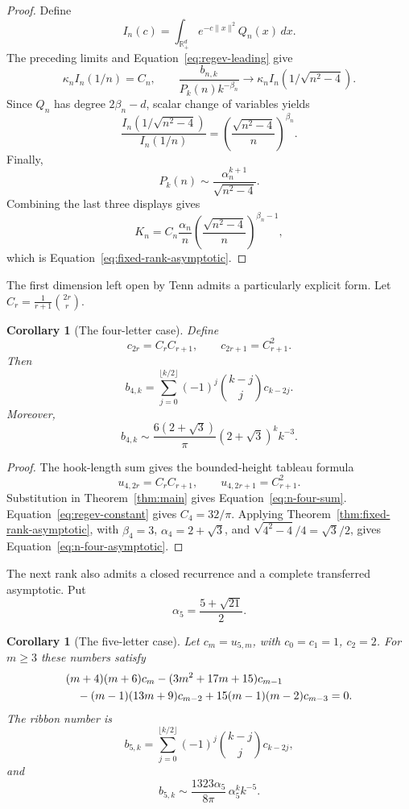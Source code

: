 \documentclass[11pt]{article}
\newtheorem{corollary}[theorem]{Corollary}
\theoremstyle{definition}
\begin{document}
\begin{proof}
Define
\[
 I_n(c)=\int_{\mathbb R_+^d}e^{-c\lVert x\rVert^2}Q_n(x)\,dx.
\]
The preceding limits and Equation~\eqref{eq:regev-leading} give
\[
 \kappa_n I_n(1/n)=C_n,
 \qquad
 \frac{b_{n,k}}{P_k(n)k^{-\beta_n}}
   \longrightarrow \kappa_n I_n(1/\sqrt{n^2-4}).
\]
Since $Q_n$ has degree $2\beta_n-d$, scalar change of variables yields
\[
 \frac{I_n(1/\sqrt{n^2-4})}{I_n(1/n)}
 =\left(\frac{\sqrt{n^2-4}}{n}\right)^{\beta_n}.
\]
Finally,
\[
 P_k(n)\sim\frac{\alpha_n^{k+1}}{\sqrt{n^2-4}}.
\]
Combining the last three displays gives
\[
 K_n=C_n\frac{\alpha_n}{n}
 \left(\frac{\sqrt{n^2-4}}{n}\right)^{\beta_n-1},
\]
which is Equation~\eqref{eq:fixed-rank-asymptotic}.
\end{proof}

The first dimension left open by Tenn admits a particularly explicit form.
Let $C_r=\frac1{r+1}\binom{2r}{r}$.

\begin{corollary}[The four-letter case]\label{cor:n-four}
Define
\[
 c_{2r}=C_rC_{r+1},\qquad c_{2r+1}=C_{r+1}^2.
\]
Then
\begin{equation}\label{eq:n-four-sum}
 b_{4,k}=\sum_{j=0}^{\lfloor k/2\rfloor}
 (-1)^j\binom{k-j}{j}c_{k-2j}.
\end{equation}
Moreover,
\begin{equation}\label{eq:n-four-asymptotic}
 b_{4,k}\sim
 \frac{6(2+\sqrt3)}{\pi}
 (2+\sqrt3)^k k^{-3}.
\end{equation}
\end{corollary}

\begin{proof}
The hook-length sum gives the bounded-height tableau formula
\[
 u_{4,2r}=C_rC_{r+1},\qquad u_{4,2r+1}=C_{r+1}^2.
\]
Substitution in Theorem~\ref{thm:main} gives
Equation~\eqref{eq:n-four-sum}.
Equation~\eqref{eq:regev-constant} gives $C_4=32/\pi$.  Applying
Theorem~\ref{thm:fixed-rank-asymptotic}, with
$\beta_4=3$, $\alpha_4=2+\sqrt3$, and
$\sqrt{4^2-4}/4=\sqrt3/2$, gives
Equation~\eqref{eq:n-four-asymptotic}.
\end{proof}

The next rank also admits a closed recurrence and a complete transferred
asymptotic.  Put
\[
 \alpha_5=\frac{5+\sqrt{21}}2.
\]

\begin{corollary}[The five-letter case]\label{cor:n-five}
Let $c_m=u_{5,m}$, with $c_0=c_1=1$, $c_2=2$.  For $m\ge3$ these numbers
satisfy
\begin{align}\label{eq:height-five-recurrence}
 &(m+4)(m+6)c_m-(3m^2+17m+15)c_{m-1}\\
 &\quad{}-(m-1)(13m+9)c_{m-2}
 +15(m-1)(m-2)c_{m-3}=0.\notag
\end{align}
The ribbon number is
\begin{equation}\label{eq:n-five-sum}
 b_{5,k}=\sum_{j=0}^{\lfloor k/2\rfloor}
 (-1)^j\binom{k-j}{j}c_{k-2j},
\end{equation}
and
\begin{equation}\label{eq:n-five-asymptotic}
 b_{5,k}\sim
 \frac{1323\alpha_5}{8\pi}\,
 \alpha_5^k k^{-5}.
\end{equation}
\end{corollary}
\end{document}
